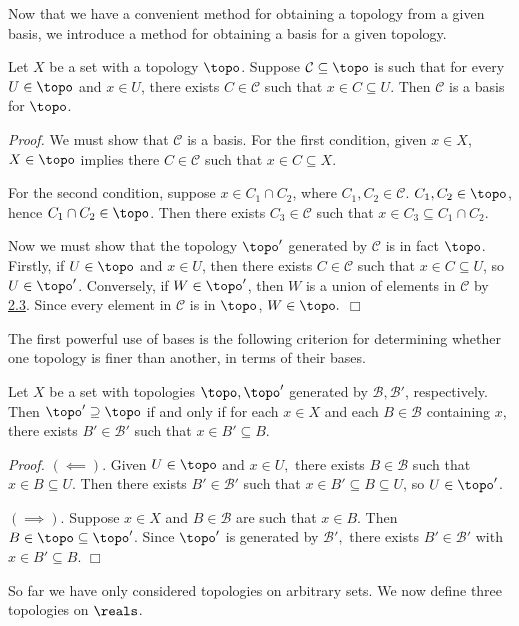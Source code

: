 Now that we have a convenient method for obtaining a topology from a given basis, we introduce a method for obtaining a basis for a given topology.
\begin{lemma}\label{2.4}
    Let $X$ be a set with a topology $\topo$. Suppose $\mathcal{C} \subseteq \topo$ is such that for every $U \in \topo$ and $x \in U$, there exists $C \in \mathcal{C}$ such that $x \in C \subseteq U$. Then $\mathcal{C}$ is a basis for $\topo$.
\end{lemma}
{\it Proof.} We must show that $\mathcal{C}$ is a basis. For the first condition, given $x \in X$, $X \in \topo$ implies there $C \in \mathcal{C}$ such that $x \in C \subseteq X$.

For the second condition, suppose $x \in C_1\cap C_2$, where $C_1, C_2 \in \mathcal{C}$. $C_1, C_2 \in \topo$, hence $C_1 \cap C_2 \in \topo$. Then there exists $C_3 \in \mathcal{C}$ such that $x \in C_3 \subseteq C_1 \cap C_2$.

Now we must show that the topology $\topo'$ generated by $\mathcal{C}$ is in fact $\topo$. Firstly, if $U \in \topo$ and $x \in U$, then there exists $C \in \mathcal{C}$ such that $x \in C \subseteq U$, so $U \in \topo'$. Conversely, if $W \in \topo'$, then $W$ is a union of elements in $\mathcal{C}$ by \hyperref[2.3]{2.3}. Since every element in $\mathcal{C}$ is in $\topo$, $W \in \topo.$ $\Box$

The first powerful use of bases is the following criterion for determining whether one topology is finer than another, in terms of their bases.
\begin{lemma}\label{2.5}
    Let $X$ be a set with topologies $\topo, \topo'$ generated by $\mathcal{B}, \mathcal{B}'$, respectively. Then $\topo' \supseteq \topo$ if and only if for each $x \in X$ and each $B \in \mathcal{B}$ containing $x$, there exists $B' \in \mathcal{B}'$ such that $x \in B' \subseteq B$.
\end{lemma}
{\it Proof.} $(\impliedby)$. Given $U \in \topo$ and $x \in U,$ there exists $B \in \mathcal{B}$ such that $x \in B \subseteq U$. Then there exists $B' \in \mathcal{B}'$ such that $x \in B' \subseteq B \subseteq U$, so $U \in \topo'$. 

$(\implies)$. Suppose $x \in X$ and $B \in \mathcal{B}$ are such that $x \in B$. Then $B \in \topo \subseteq \topo'$. Since $\topo'$ is generated by $\mathcal{B}',$ there exists $B' \in \mathcal{B}'$ with $x \in B' \subseteq B$. $\Box$

So far we have only considered topologies on arbitrary sets. We now define three topologies on $\reals$.

